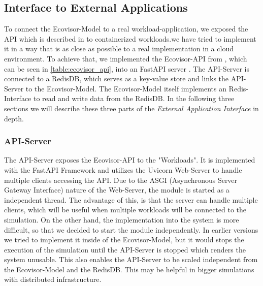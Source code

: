 \subsection{Interface to External Applications}


To connect the Ecovisor-Model to a real workload-application, we exposed the API which is described in \cite{souza2023} to containerized workloads.we have tried to implement it in a way that is as close as possible to a real implementation in a cloud environment.
To achieve that, we implemented the Ecovisor-API from \cite{souza2023}, which can be seen in \ref{table:ecovisor_api}, into an FastAPI server \cite{fastapi}.
The API-Server is connected to a RedisDB\cite{redis}, which serves as a key-value store and links the API-Server to the Ecovisor-Model. 
The Ecovisor-Model itself implements an Redis-Interface to read and write data from the RedisDB.
In the following three sections we will describe these three parts of the \textit{External Application Interface} in depth.

\subsubsection{API-Server}
The API-Server exposes the Ecovisor-API to the "Workloads". It is implemented with the FastAPI Framework and utilizes the Uvicorn Web-Server \cite{uvicorn} to handle multiple clients accessing the API. Due to the ASGI (Asynchronous Server Gateway Interface) nature of the Web-Server, the module is started as a independent thread. The advantage of this, is that the server can handle multiple clients, which will be useful when multiple workloads will be connected to the simulation. On the other hand, the implementation into the system is more difficult, so that we decided to start the module independently. In earlier versions we tried to implement it inside of the Ecovisor-Model, but it would stops the execution of the simulation until the API-Server is stopped which renders the system unusable. This also enables the API-Server to be scaled independent from the Ecovisor-Model and the RedisDB. This may be helpful in bigger simulations with distributed infrastructure.

